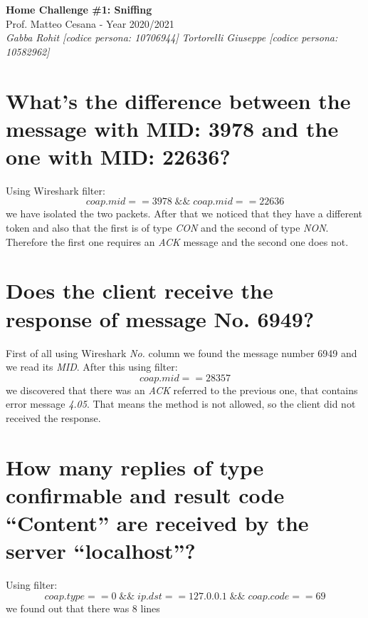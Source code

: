 \documentclass{article}
\begin{document}
\begin{titlepage}
   \begin{center}
      \Huge\textbf{Home Challenge \#1: Sniffing}\\
      \vspace{5mm} %
      \Large Prof. Matteo Cesana - Year 2020/2021\\
      \vspace{5mm} %
      \large\textit{Gabba Rohit [codice persona: 10706944]}
      \linebreak
      \large\textit{Tortorelli Giuseppe [codice persona: 10582962]}
   \end{center}
\end{titlepage}
\printindex

\tableofcontents
\pagebreak

\section{What’s the difference between the message with MID:
3978 and the one with MID: 22636?}
Using Wireshark filter: \[ coap.mid == 3978 \; \&\&  \; coap.mid == 22636 \] we have isolated the two packets. After that we noticed that they have a different token and also that the first is of type \textit{CON} and the second of type \textit{NON}. Therefore the first one requires an \textit{ACK} message and the second one does not.

\section{Does the client receive the response of message No.
6949?}
First of all using Wireshark \textit{No.} column we found the message number 6949 and we read its \textit{MID}. After this using filter: \[ coap.mid == 28357 \] we discovered that there was an \textit{ACK} referred to the previous one, that contains error message \textit{4.05}. That means the method is not allowed, so the client did not received the response.

\section{How many replies of type confirmable and result code
“Content” are received by the server “localhost”?}
Using filter: \[ coap.type == 0 \; \&\&  \; ip.dst == 127.0.0.1 \; \&\& \; coap.code == 69 \] we found out that there was 8 lines
\end{document}
